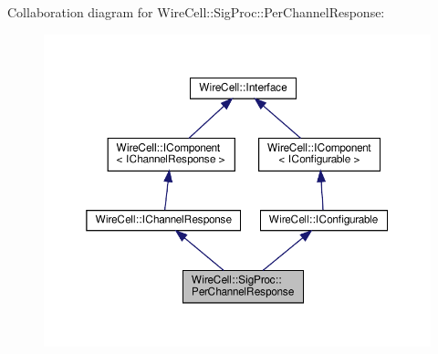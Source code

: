 Collaboration diagram for Wire\+Cell\+:\+:Sig\+Proc\+:\+:Per\+Channel\+Response\+:
\nopagebreak
\begin{figure}[H]
\begin{center}
\leavevmode
\includegraphics[width=350pt]{class_wire_cell_1_1_sig_proc_1_1_per_channel_response__coll__graph}
\end{center}
\end{figure}
